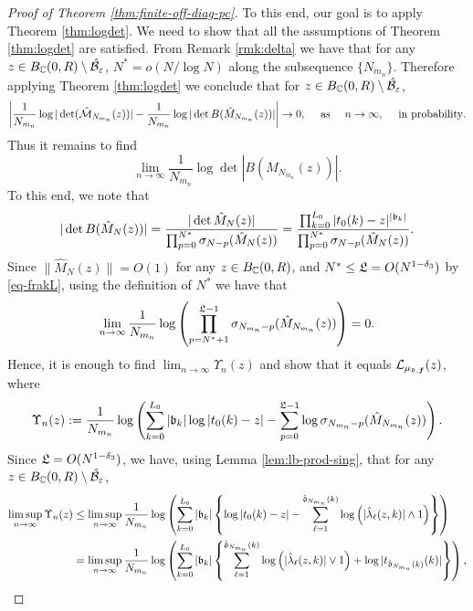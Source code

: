 \documentclass{amsart}
\numberwithin{equation}{section}
\def\corOZ{}
\begin{document}
\begin{proof}[Proof of Theorem \ref{thm:finite-off-diag-pc}]
To this end, our goal is to apply Theorem \ref{thm:logdet}. We need to show that all the assumptions of Theorem \ref{thm:logdet} are satisfied. From Remark \ref{rmk:delta} we have that for any $z \in B_\C(0,R)\setminus
\corOZ{\hat \cN_\vep}$, $N^* =o(N/\log N)$ along the subsequence $\{N_{m_n}\}$. Therefore applying Theorem \ref{thm:logdet} we conclude that for $z \in B_\C(0,R)\setminus
\corOZ{\hat \cN_\vep}$,
\begin{equation}\label{eq:conv-prob}
\left| \frac{1}{N_{m_n}} \log |\det (\hat{\mathcal{M}}_{N_{m_n}}(z))| - \frac{1}{N_{m_n}}\log|\det B(\hat{M}_{N_{m_n}}(z))|\right| \to 0, \quad \text{ as } \quad n \to \infty, \quad \text{ in probability}.
\end{equation}
Thus it remains to find
\[
\lim_{n \to \infty} \frac{1}{N_{m_n}}\log \det \left|B(\hat{M}_{N_{m_n}}(z))\right|.
\]
To this end, we note that
\begin{equation}\label{eq:B_N-limit0}
|\det B(\hat{M}_{N}(z)) |= \frac{|\det \hat{M}_{N}(z)|}{\prod_{p=0}^{N^*} \sigma_{N-p}(\hat{M}_{N}(z))}= \frac{\prod_{k=0}^{L_0}|t_0(k)-z|^{|\mathfrak{b}_k|}}{\prod_{p=0}^{N^*} \sigma_{N-p}(\hat{M}_{N}(z))}.
\end{equation}
Since $\|\hat{M}_N(z)\| =O(1)$ for any $z \in B_{\mathbb{C}}(0,R)$, and
$\corOZ{N^*\leq \gL=O(N^{1-\delta_3})}$ \corOZ{by \eqref{eq-frakL},
using} the definition of $N^*$ we have that
\[
\lim_{n \to \infty} \frac{1}{N_{m_n}} \log \left( \prod_{p=N^*+1}^{\mathfrak{L}-1} \sigma_{N_{m_n}-p}(\hat{M}_{N_{m_n}}(z)) \right) =0.
\]
Hence, it is enough to find $\lim_{n \to \infty} \Upsilon_n(z)$ and show that it equals $\mathcal{L}_{\mu_{\mathfrak{d}, {\bm f}}}(z)$, where
\[
\Upsilon_n(z):= \frac{1}{N_{m_n}}\log \left( \sum_{k=0}^{L_0} |\mathfrak{b}_k| \log |t_0(k)-z| - \sum_{p=0}^{\mathfrak{L}-1} \log \sigma_{N_{m_n}-p}(\hat{M}_{N_{m_n}}(z)) \right).
\]
\corOZ{Since} $\gL  =O(N^{\corOZ{1-\delta_3}})$,
\corOZ{we have,}
using Lemma \ref{lem:lb-prod-sing},
\corOZ{that} for any $z \in B_\C(0,R)\setminus \corOZ{\hat \cN_\vep}$,
\begin{align}\label{eq:limsup-ubd}
\limsup_{n \to \infty} \Upsilon_n(z)& \le \limsup_{n \to \infty} \frac{1}{N_{m_n}}\log \left( \sum_{k=0}^{L_0} |\gb_k|\left\{ \log |t_0(k)-z| -  \sum_{\ell=1}^{\hat\gd_{N_{m_n}}(k)} \log \left(|\hat{\lambda}_\ell(z,k)| \wedge 1\right)\right\} \right)\notag\\
& = \limsup_{n \to \infty} \frac{1}{N_{m_n}}\log \left( \sum_{k=0}^{L_0} |\gb_k|\left\{  \sum_{\ell=1}^{\hat\gd_{N_{m_n}}(k)} \log \left(|\hat{\lambda}_\ell(z,k)| \vee 1\right) + \log |t_{\hat\gd_{N_{m_n}}(k)}(k)|\right\} \right),

\end{align}
\end{proof}
\end{document}
